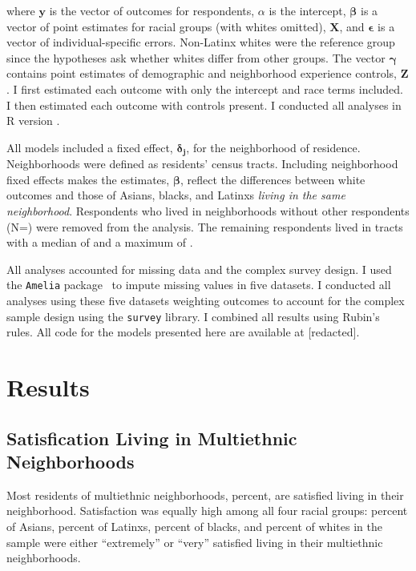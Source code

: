 \documentclass{baderart}
\begin{document}
\noindent where \(\mathbf{y}\) is the vector of outcomes for respondents, \(\alpha\) is the intercept, \(\mathbf{\beta}\) is a vector of point estimates for racial groups (with whites omitted), \(\mathbf{X}\), and \(\mathbf{\epsilon}\) is a vector of individual-specific errors. Non-Latinx whites were the reference group since the hypotheses ask whether whites differ from other groups. The vector \(\mathbf{\gamma}\) contains point estimates of demographic and neighborhood experience controls, \(\mathbf{Z}\). I first estimated each outcome with only the intercept and race terms included. I then estimated each outcome with controls present. I conducted all analyses in R version \Rversion.

All models included a fixed effect, \(\mathbf{\delta_j}\), for the neighborhood of residence. Neighborhoods were defined as residents' census tracts. Including neighborhood fixed effects makes the estimates, \(\mathbf{\beta}\), reflect the differences between white outcomes and those of Asians, blacks, and Latinxs \emph{living in the same neighborhood}. Respondents who lived in neighborhoods without other respondents (N=\oneresp) were removed from the analysis. The remaining respondents lived in tracts with a median of \medNpertract and a maximum of \maxNpertract.

All analyses accounted for missing data and the complex survey design. I used the \texttt{Amelia} package~\citep{honaker_amelia_2011} to impute missing values in five datasets. I conducted all analyses using these five datasets weighting outcomes to account for the complex sample design using the \texttt{survey} library. I combined all results using Rubin's~\citeyearpar{rubin_multiple_2004} rules. All code for the models presented here are available at [redacted].

\section{Results}\label{results}

\subsection{Satisfication Living in Multiethnic Neighborhoods}\label{satisfication-living-in-multiethnic-neighborhoods}

Most residents of multiethnic neighborhoods, \meansatisfied percent, are satisfied living in their neighborhood. Satisfaction was equally high among all four racial groups: \apisatisfied percent of Asians, \hspsatisfied percent of Latinxs, \nhbsatisfied percent of blacks, and \nhwsatisfied percent of whites in the sample were either ``extremely'' or ``very'' satisfied living in their multiethnic neighborhoods.
\end{document}
